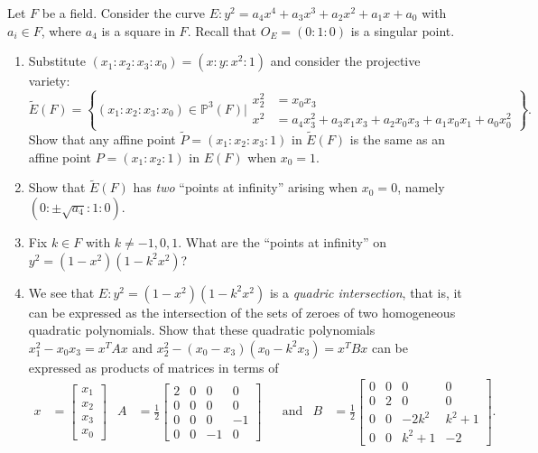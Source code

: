 \documentclass[12 pt, letterpaper]{hmcpset}
\begin{document}
\begin{problem}[Problem 3.]
	Let $F$ be a field. Consider the curve $E : y^{2} = a_{4} x^{4} + a_{3} x^{3} + a_{2} x^{2} + a_{1} x + a_{0}$ with $a_{i} \in F$, where $a_{4}$ is a square in $F$. Recall that $O_{E} = (0 : 1 : 0)$ is a singular point.
	\begin{enumerate}
		\item Substitute $(x_{1} : x_{2} : x_{3} : x_{0}) = (x : y : x^{2} : 1)$ and consider the projective variety:
			\[
				\tilde{E}(F) = \left \{ (x_{1} : x_{2} : x_{3} : x_{0}) \in \mathbb{P}^{3}(F) \Big | \begin{split}
						x_{2}^{2} & = x_{0} x_{3} \\
						x^{2} & = a_{4} x_{3}^{2} + a_{3} x_{1} x_{3} + a_{2} x_{0} x_{3} + a_{1} x_{0} x_{1} + a_{0} x_{0}^{2}
				\end{split} \right \}.
			\]
			Show that any affine point $\tilde{P} = (x_{1} : x_{2} : x_{3} : 1)$  in $\tilde{E}(F)$ is the same as an affine point $P = (x_{1} : x_{2} : 1)$ in $E(F)$ when $x_{0} = 1$.
		\item Show that $\tilde{E}(F)$ has \emph{two} ``points at infinity'' arising when $x_{0} = 0$, namely $(0 : \pm \sqrt{a_{4}} : 1 : 0)$.
		\item Fix $k \in F$ with $k \neq -1, 0, 1$. What are the ``points at infinity'' on $y^{2} = (1 - x^{2})(1 - k^{2} x^{2})$?
		\item We see that $E : y^{2} = (1 - x^{2})(1 - k^{2} x^{2})$ is a \emph{quadric intersection}, that is, it can be expressed as the intersection of the sets of zeroes of two homogeneous quadratic polynomials. Show that these quadratic polynomials $x_{1}^{2} - x_{0} x_{3} = x^{T} A x$ and $x_{2}^{2} - (x_{0} - x_{3})(x_{0} - k^{2} x_{3}) = x^{T} B x$ can be expressed as products of matrices in terms of
			\begin{align*}
				x & = \begin{bmatrix}
					x_{1} \\
					x_{2} \\
					x_{3} \\
					x_{0}
				\end{bmatrix} & A & = \frac{1}{2} \begin{bmatrix}
				2 & 0 & 0 & 0 \\
				0 & 0 & 0 & 0 \\
				0 & 0 & 0 & -1 \\
				0 & 0 & -1 & 0
				\end{bmatrix} & & \text{and} & B & = \frac{1}{2} \begin{bmatrix}
			0 & 0 & 0 & 0 \\
			0 & 2 & 0 & 0 \\
			0 & 0 & -2k^{2} & k^{2} + 1 \\
			0 & 0 & k^{2} + 1 & -2
			\end{bmatrix}.
			\end{align*}
	\end{enumerate}
\end{problem}
\end{document}
